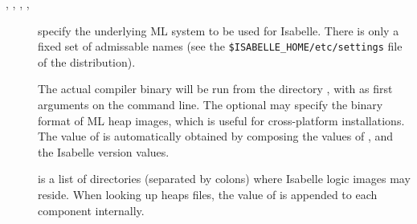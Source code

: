 \begin{isabellebody}
\begin{isamarkuptext}
\begin{description}
  \item[\hypertarget{setting.ML-SYSTEM}{\hyperlink{setting.ML-SYSTEM}{\mbox{}}}, \hypertarget{setting.ML-HOME}{\hyperlink{setting.ML-HOME}{\mbox{}}},
  \hypertarget{setting.ML-OPTIONS}{\hyperlink{setting.ML-OPTIONS}{\mbox{}}}, \hypertarget{setting.ML-PLATFORM}{\hyperlink{setting.ML-PLATFORM}{\mbox{}}}, \hypertarget{setting.ML-IDENTIFIER}{\hyperlink{setting.ML-IDENTIFIER}{\mbox{}}}] specify the underlying ML system
  to be used for Isabelle.  There is only a fixed set of admissable
  \hyperlink{setting.ML-SYSTEM}{\mbox{}} names (see the \verb|$ISABELLE_HOME/etc/settings| file of the distribution).
  
  The actual compiler binary will be run from the directory \hyperlink{setting.ML-HOME}{\mbox{}}, with \hyperlink{setting.ML-OPTIONS}{\mbox{}} as first arguments on the
  command line.  The optional \hyperlink{setting.ML-PLATFORM}{\mbox{}} may specify the
  binary format of ML heap images, which is useful for cross-platform
  installations.  The value of \hyperlink{setting.ML-IDENTIFIER}{\mbox{}} is
  automatically obtained by composing the values of \hyperlink{setting.ML-SYSTEM}{\mbox{}}, \hyperlink{setting.ML-PLATFORM}{\mbox{}} and the Isabelle version values.
  
  \item[\hypertarget{setting.ISABELLE-PATH}{\hyperlink{setting.ISABELLE-PATH}{\mbox{}}}] is a list of directories
  (separated by colons) where Isabelle logic images may reside.  When
  looking up heaps files, the value of \hyperlink{setting.ML-IDENTIFIER}{\mbox{}} is
  appended to each component internally.
  

\end{description}
\end{isamarkuptext}
\end{isabellebody}
